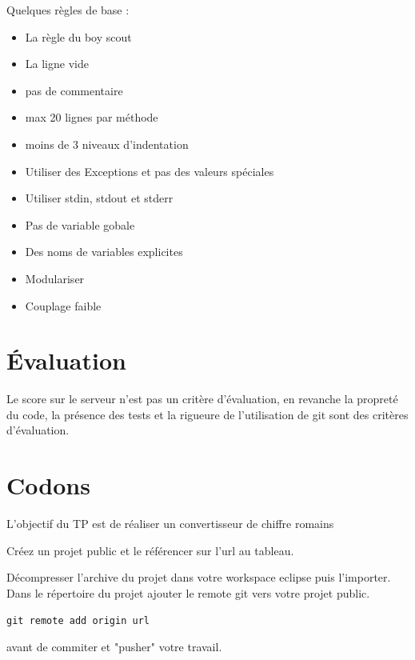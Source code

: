 \documentclass[a4paper]{article}
\begin{document}
Quelques règles de base : 
\begin{itemize}
  \item La règle du boy scout
  \item La ligne vide 
  \item pas de commentaire
  \item max 20 lignes par méthode
  \item moins de 3 niveaux d'indentation
  \item Utiliser des Exceptions et pas des valeurs spéciales
  \item Utiliser stdin, stdout et stderr
  \item Pas de variable gobale
  \item Des noms de variables explicites
  \item Modulariser
  \item Couplage faible
\end{itemize}

\section*{Évaluation}
Le score sur le serveur n'est pas un critère d'évaluation, en revanche la propreté du code, la présence des tests et la rigueure de l'utilisation de git sont des critères d'évaluation.

\section*{Codons}
L’objectif du TP est de réaliser un convertisseur de chiffre romains

Créez un projet public et le référencer sur l'url au tableau.

Décompresser l’archive du projet dans votre workspace eclipse puis l’importer.
Dans le répertoire du projet ajouter le remote git vers votre projet public.
\begin{verbatim}
git remote add origin url
\end{verbatim}
avant de commiter et "pusher" votre travail.
\end{document}
